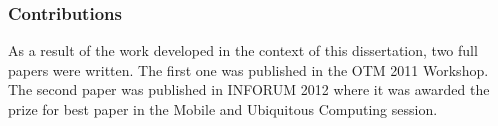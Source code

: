 \subsubsection{Contributions}
\label{sec:contributions}
As a result of the work developed in the context of this dissertation,
two full papers were written. The first one
\cite{gonccalves2011privacy} was published in the OTM 2011 Workshop.
The second paper \cite{inforum2012} was published in INFORUM 2012
where it was awarded the prize for best paper in the Mobile and
Ubiquitous Computing session.

